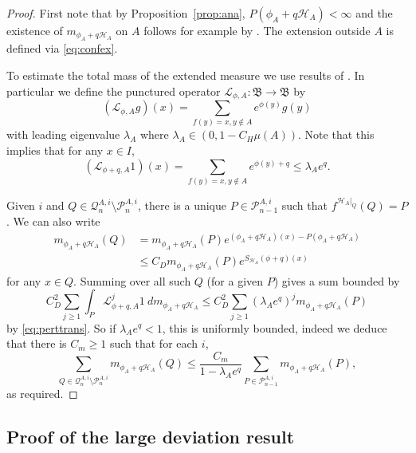 \documentclass[11pt, reqno]{amsart}
\numberwithin{equation}{section}
\theoremstyle{plain}%
\theoremstyle{definition}
\def\Q{\ensuremath{\mathcal Q}}
\def\L{\ensuremath{\mathcal L}}
\def\P{\ensuremath{\mathcal P}}
\def\sm{\setminus}
\renewcommand{\H}{\mathcal{H}}
\theoremstyle{nonumberplain}
\begin{document}
\begin{proof}
First note that by Proposition~\ref{prop:ana}, $P\left(\phi_A+q\H_A\right)<\infty$ and the existence of 
$m_{\phi_A+q\H_A}$ on $A$ follows for example by \cite[Theorem 4]{Sar99}.  The extension outside $A$ is defined via \eqref{eq:confex}.

To estimate the total mass of the extended measure we use results of \cite[Section 4]{JurTod25}.  In particular we define the punctured operator $\L_{\phi, A}: \mathfrak{B} \to \mathfrak{B}$ by 
$$(\L_{\phi, A}g)(x) = \sum_{f(y)= x, y\notin A} e^{\phi(y)}g(y)$$
 with leading eigenvalue $\lambda_A$ where $\lambda_A\in (0, 1-C_H\mu(A))$.   Note that this implies that for any $x\in I$,
 \begin{equation}
 (\L_{\phi+q, A}1)(x) =  \sum_{f(y)= x, y\notin A} e^{\phi(y)+q}\le \lambda_A e^q.
 \label{eq:perttrans}
 \end{equation}
 
Given $i$ and $Q\in \Q^{A, i}_n\sm \P_n^{A, i}$, there is a unique $P\in \P^{A, i}_{n-1}$ such that $f^{ \H_A|_Q}(Q) = P$.  We can also write
 \begin{align*} m_{\phi_A+q\H_A}(Q)&= m_{\phi_A+q\H_A}(P)e^{(\phi_A+q\H_A)(x)-P(\phi_A+q\H_A)} \\
 &\le C_D m_{\phi_A+q\H_A}(P)e^{S_{\H_A}(\phi+q)(x)} 
\end{align*}
 for any $x\in Q$.  Summing over all such $Q$ (for a given $P$) gives a sum bounded by
 $$C_D^{2}\sum_{j\ge 1} \int_P \L_{\phi+q, A}^j1~dm_{\phi_A+q\H_A}\le C_D^{2}\sum_{j\ge 1} \left(\lambda_A e^q\right)^jm_{\phi_A+q\H_A}(P)$$
 by \eqref{eq:perttrans}.  So if $\lambda_Ae^q<1$, this is uniformly bounded, indeed we deduce that there is $C_m\ge 1$ such that for each $i$,
 $$\sum_{Q\in \Q^{A, i}_n\sm \P_n^{A, i}}m_{\phi_A+q\H_A}(Q)\le \frac{C_m}{1-\lambda_Ae^q} \sum_{P\in \P^{A, i}_{n-1}}m_{\phi_A+q\H_A}(P),$$
 as required.
\end{proof}

\subsection{Proof of the large deviation result}
\end{document}
